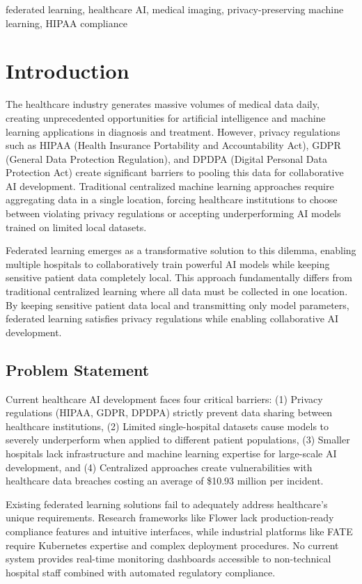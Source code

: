\documentclass[conference]{IEEEtran}
\begin{document}
\begin{IEEEkeywords}
federated learning, healthcare AI, medical imaging, privacy-preserving machine learning, HIPAA compliance
\end{IEEEkeywords}

\section{Introduction}
The healthcare industry generates massive volumes of medical data daily, creating unprecedented opportunities for artificial intelligence and machine learning applications in diagnosis and treatment. However, privacy regulations such as HIPAA (Health Insurance Portability and Accountability Act), GDPR (General Data Protection Regulation), and DPDPA (Digital Personal Data Protection Act) create significant barriers to pooling this data for collaborative AI development. Traditional centralized machine learning approaches require aggregating data in a single location, forcing healthcare institutions to choose between violating privacy regulations or accepting underperforming AI models trained on limited local datasets.

Federated learning \cite{mcmahan2017communication} emerges as a transformative solution to this dilemma, enabling multiple hospitals to collaboratively train powerful AI models while keeping sensitive patient data completely local. This approach fundamentally differs from traditional centralized learning where all data must be collected in one location. By keeping sensitive patient data local and transmitting only model parameters, federated learning satisfies privacy regulations while enabling collaborative AI development.

\subsection{Problem Statement}
Current healthcare AI development faces four critical barriers: (1) Privacy regulations (HIPAA, GDPR, DPDPA) strictly prevent data sharing between healthcare institutions, (2) Limited single-hospital datasets cause models to severely underperform when applied to different patient populations, (3) Smaller hospitals lack infrastructure and machine learning expertise for large-scale AI development, and (4) Centralized approaches create vulnerabilities with healthcare data breaches costing an average of \$10.93 million per incident.

Existing federated learning solutions fail to adequately address healthcare's unique requirements. Research frameworks like Flower \cite{beutel2020flower} lack production-ready compliance features and intuitive interfaces, while industrial platforms like FATE \cite{liu2021fate} require Kubernetes expertise and complex deployment procedures. No current system provides real-time monitoring dashboards accessible to non-technical hospital staff combined with automated regulatory compliance.
\end{document}
